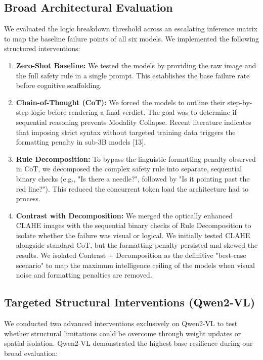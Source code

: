 \documentclass{article}
\begin{document}
\subsection*{Broad Architectural Evaluation}

We evaluated the logic breakdown threshold across an escalating inference matrix to map the baseline failure points of all six models. We implemented the following structured interventions:
\begin{enumerate}
    \item \textbf{Zero-Shot Baseline:} We tested the models by providing the raw image and the full safety rule in a single prompt. This establishes the base failure rate before cognitive scaffolding.
    \item \textbf{Chain-of-Thought (CoT):} We forced the models to outline their step-by-step logic before rendering a final verdict. The goal was to determine if sequential reasoning prevents Modality Collapse. Recent literature indicates that imposing strict syntax without targeted training data triggers the formatting penalty in sub-3B models [13].
    \item \textbf{Rule Decomposition:} To bypass the linguistic formatting penalty observed in CoT, we decomposed the complex safety rule into separate, sequential binary checks (e.g., "Is there a needle?", followed by "Is it pointing past the red line?"). This reduced the concurrent token load the architecture had to process.
    \item \textbf{Contrast with Decomposition:} We merged the optically enhanced CLAHE images with the sequential binary checks of Rule Decomposition to isolate whether the failure was visual or logical. We initially tested CLAHE alongside standard CoT, but the formatting penalty persisted and skewed the results. We isolated Contrast + Decomposition as the definitive "best-case scenario" to map the maximum intelligence ceiling of the models when visual noise and formatting penalties are removed.
\end{enumerate}

\subsection*{Targeted Structural Interventions (Qwen2-VL)}

We conducted two advanced interventions exclusively on Qwen2-VL to test whether structural limitations could be overcome through weight updates or spatial isolation. Qwen2-VL demonstrated the highest base resilience during our broad evaluation:
\end{document}
